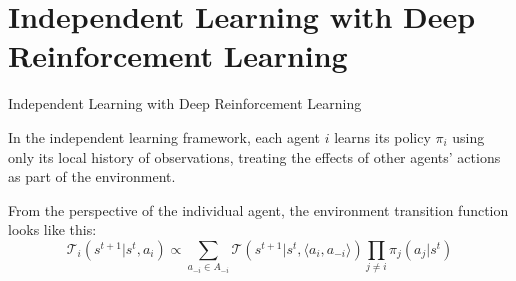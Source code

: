 \section{Independent Learning with Deep Reinforcement Learning}

\begin{frame}[t]{Independent Learning with Deep Reinforcement Learning}
    \begin{reminderbox}
        In the independent learning framework, each agent $i$ learns its policy $\pi_i$ using only its local history of observations, treating the effects of other agents' actions as part of the environment.

        \blist
            \item From the perspective of the individual agent, the environment transition function looks like this:
        \elist
        \vspace{5pt}
        \[
        \mathcal{T}_i(s^{t+1} | s^t, a_i) \propto \sum_{a_{-i} \in A_{-i}} \mathcal{T}(s^{t+1} | s^t, \langle a_i, a_{-i} \rangle) \prod_{j \neq i} \pi_j(a_j | s^t)
        \]
    \end{reminderbox}



\end{frame}

